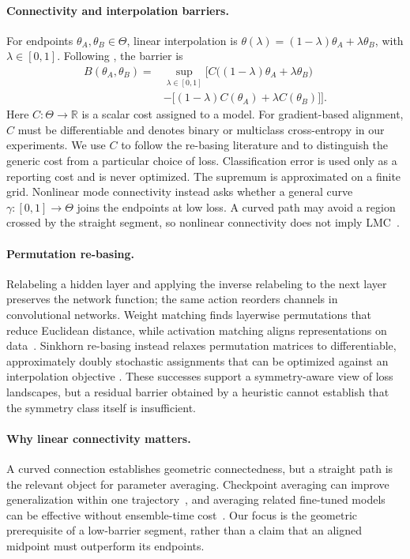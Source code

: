 \documentclass[twoside]{article}
\begin{document}
\paragraph{Connectivity and interpolation barriers.}
For endpoints $\theta_A,\theta_B\in\Theta$, linear interpolation is
$\theta(\lambda)=(1-\lambda)\theta_A+\lambda\theta_B$, with
$\lambda\in[0,1]$.  Following \citet{entezari2021role}, the barrier is
\begin{equation}
\begin{aligned}
B(\theta_A,\theta_B)
={}&\sup_{\lambda\in[0,1]}
\Big[C\big((1-\lambda)\theta_A+\lambda\theta_B\big)\\
&-\big[(1-\lambda)C(\theta_A)+\lambda C(\theta_B)\big]\Big].
\end{aligned}
\label{eq:barrier}
\end{equation}
Here $C:\Theta\rightarrow\mathbb{R}$ is a scalar cost assigned to a model.  For
gradient-based alignment, $C$ must be differentiable and denotes binary or
multiclass cross-entropy in our experiments.  We use $C$ to follow the
re-basing literature and to distinguish the generic cost from a particular
choice of loss.  Classification error is used only as a reporting cost and is
never optimized.  The supremum is approximated on a finite grid.  Nonlinear
mode connectivity instead asks whether a general curve
$\gamma:[0,1]\rightarrow\Theta$ joins the endpoints at low loss.  A curved path
may avoid a region crossed by the straight segment, so nonlinear connectivity
does not imply LMC~\citep{draxler2018essentially,garipov2018loss}.

\paragraph{Permutation re-basing.}
Relabeling a hidden layer and applying the inverse relabeling to the next
layer preserves the network function; the same action reorders channels in
convolutional networks.  Weight matching finds layerwise permutations that
reduce Euclidean distance, while activation matching aligns representations on
data~\citep{ainsworth2023git}.  Sinkhorn re-basing instead relaxes permutation
matrices to differentiable, approximately doubly stochastic assignments that
can be optimized against an interpolation objective
\citep{guerrero2023rebasin}.  These successes support a symmetry-aware view of
loss landscapes, but a residual barrier obtained by a heuristic cannot
establish that the symmetry class itself is insufficient.

\paragraph{Why linear connectivity matters.}
A curved connection establishes geometric connectedness, but a straight path
is the relevant object for parameter averaging.  Checkpoint averaging can
improve generalization within one trajectory~\citep{izmailov2018averaging}, and
averaging related fine-tuned models can be effective without ensemble-time
cost~\citep{wortsman2022model}.  Our focus is the geometric prerequisite of a
low-barrier segment, rather than a claim that an aligned midpoint must
outperform its endpoints.
\end{document}
